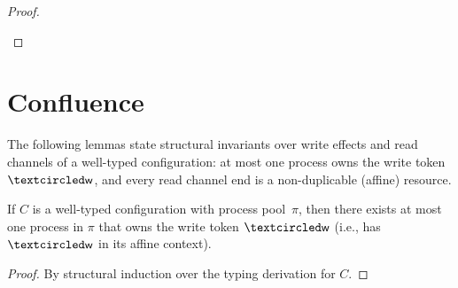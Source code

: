 \begin{theorem}[Preservation]
\begin{proof}
\begin{itemize}[leftmargin=*]
\begin{llproof}



      
    \end{llproof}    
  \end{itemize}
\end{proof}
\end{theorem}

\section{Confluence}

The following lemmas state structural invariants over write effects and read
channels of a well-typed configuration: at most one process owns the write token
$\wrtok$, and every read channel end is a non-duplicable (affine) resource.


\begin{lemma}
\label{lem:UniqueWriter}
If $C$ is a well-typed configuration with process pool~$\pi$, then there exists at
most one process in $\pi$ that owns the write token $\wrtok$ (i.e., has $\wrtok$
in its affine context).
\begin{proof}
By structural induction over the typing derivation for $C$.
\end{proof}
\end{lemma}

